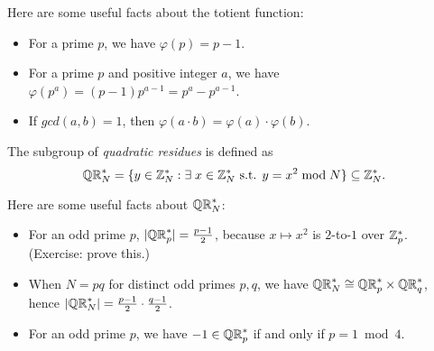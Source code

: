 \documentclass[11pt]{article}
\begin{document}
\noindent Here are some useful facts about the totient function:
\begin{itemize}
\item For a prime $p$, we have $\varphi(p) = p - 1$.
\item For a prime $p$ and positive integer $a$, we have $\varphi(p^a)
  = (p-1) p^{a-1} = p^a - p^{a-1}$.
\item If $gcd(a,b) = 1$, then $\varphi(a \cdot b) = \varphi(a) \cdot
  \varphi(b)$.
\end{itemize}

\begin{definition}
  The subgroup of \emph{quadratic residues} is defined as \[ \mathbb{QR}_{N}^{*}
  = \{y \in \mathbb{Z}_N^{*} : \exists\; x \in \mathbb{Z}_N^{*} \text{ s.t. } y = x^2
    \bmod N\} \subseteq \mathbb{Z}_N^{*}. \]
\end{definition}

\noindent Here are some useful facts about $\mathbb{QR}_{N}^{*}$:
\begin{itemize}
\item For an odd prime $p$, $\lvert\mathbb{QR}_{p}^{*}\rvert = \frac{p-1}{2}$, because
  $x \mapsto x^{2}$ is $2$-to-$1$ over $\mathbb{Z}_p^{*}$.  (Exercise: prove
  this.)

\item When $N = pq$ for distinct odd primes $p,q$, we have $\mathbb{QR}_{N}^{*}
  \cong \mathbb{QR}_{p}^{*} \times \mathbb{QR}_{q}^{*}$, hence $\lvert\mathbb{QR}_{N}^{*}\rvert =
  \frac{p-1}{2} \cdot \frac{q-1}{2}$.

\item For an odd prime $p$, we have $-1 \in \mathbb{QR}_{p}^{*}$ if and only if
  $p = 1 \bmod 4$.
\end{itemize}
\end{document}
